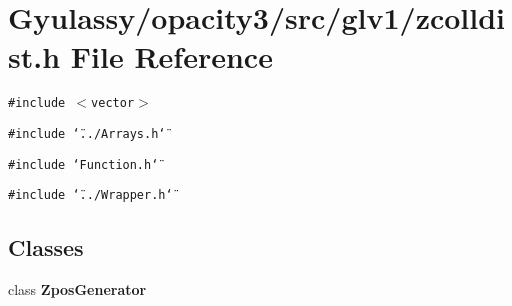 \section{Gyulassy/opacity3/src/glv1/zcolldist.h File Reference}
\label{zcolldist_8h}
{\tt \#include $<$vector$>$}\par
{\tt \#include \char`\"{}../Arrays.h\char`\"{}}\par
{\tt \#include \char`\"{}Function.h\char`\"{}}\par
{\tt \#include \char`\"{}../Wrapper.h\char`\"{}}\par
\subsection*{Classes}
\begin{CompactItemize}
\item 
class {\bf ZposGenerator}
\end{CompactItemize}

